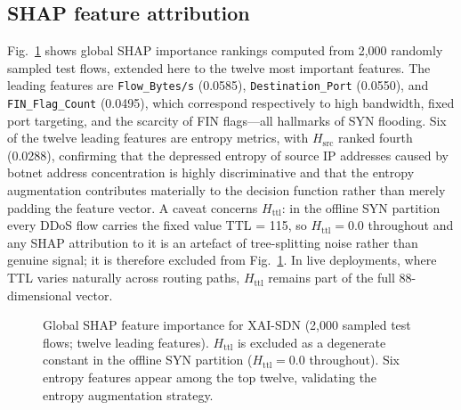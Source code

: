 ﻿\documentclass[journal]{IEEEtran}
\begin{document}
\subsection{SHAP feature attribution}
Fig.~\ref{fig:shap} shows global SHAP importance rankings computed from 2,000 randomly sampled test flows, extended here to the twelve most important features. The leading features are \texttt{Flow\_Bytes/s} (0.0585), \texttt{Destination\_Port} (0.0550), and \texttt{FIN\_Flag\_Count} (0.0495), which correspond respectively to high bandwidth, fixed port targeting, and the scarcity of FIN flags---all hallmarks of SYN flooding. Six of the twelve leading features are entropy metrics, with $H_{\mathrm{src}}$ ranked fourth (0.0288), confirming that the depressed entropy of source IP addresses caused by botnet address concentration is highly discriminative and that the entropy augmentation contributes materially to the decision function rather than merely padding the feature vector. A caveat concerns $H_{\mathrm{ttl}}$: in the offline SYN partition every DDoS flow carries the fixed value TTL = 115, so $H_{\mathrm{ttl}} = 0.0$ throughout and any SHAP attribution to it is an artefact of tree-splitting noise rather than genuine signal; it is therefore excluded from Fig.~\ref{fig:shap}. In live deployments, where TTL varies naturally across routing paths, $H_{\mathrm{ttl}}$ remains part of the full 88-dimensional vector.

\begin{figure}[!t]
\centering
{}
\caption{Global SHAP feature importance for XAI-SDN (2,000 sampled test flows; twelve leading features). $H_{\mathrm{ttl}}$ is excluded as a degenerate constant in the offline SYN partition ($H_{\mathrm{ttl}}=0.0$ throughout). Six entropy features appear among the top twelve, validating the entropy augmentation strategy.}
\label{fig:shap}
\end{figure}
\end{document}
